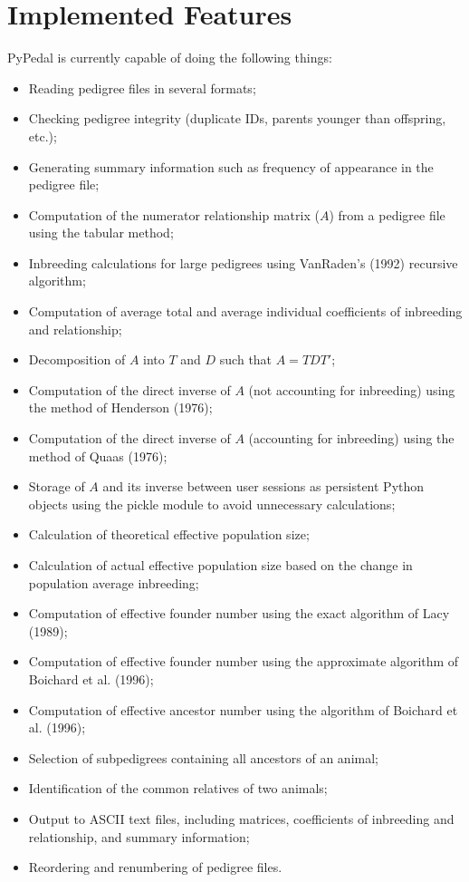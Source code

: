 \section{Implemented Features}
PyPedal is currently capable of doing the following things:
\begin{itemize}
\item Reading pedigree files in several formats;
\item Checking pedigree integrity (duplicate IDs, parents younger than offspring, etc.);
\item Generating summary information such as frequency of appearance in the pedigree file;
\item Computation of the numerator relationship matrix ($A$) from a pedigree file using the tabular method;
\item Inbreeding calculations for large pedigrees using Van{R}aden's (1992) recursive algorithm;
\item Computation of average total and average individual coefficients of inbreeding and relationship;
\item Decomposition of $A$ into $T$ and $D$ such that $A=TDT'$;
\item Computation of the direct inverse of $A$ (not accounting for inbreeding) using the method of Henderson (1976);
\item Computation of the direct inverse of $A$ (accounting for inbreeding) using the method of Quaas (1976);
\item Storage of $A$ and its inverse between user sessions as persistent Python objects using the pickle module to avoid unnecessary calculations;
\item Calculation of theoretical effective population size;
\item Calculation of actual effective population size based on the change in population average inbreeding;
\item Computation of effective founder number using the exact algorithm of Lacy (1989);
\item Computation of effective founder number using the approximate algorithm of Boichard et al. (1996);
\item Computation of effective ancestor number using the algorithm of Boichard et al. (1996);
\item Selection of subpedigrees containing all ancestors of an animal;
\item Identification of the common relatives of two animals;
\item Output to ASCII text files, including matrices, coefficients of inbreeding and relationship, and summary information;
\item Reordering and renumbering of pedigree files.
\end{itemize}

